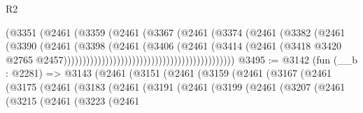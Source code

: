 \begin{lexlean}{R2}
\begin{coremodule}
                                                        (@3351
                                                          (@2461
                                                            (@3359
                                                              (@2461
                                                                (@3367
                                                                  (@2461
                                                                    (@3374
                                                                      (@2461
                                                                        (@3382
                                                                          (@2461
                                                                            (@3390
                                                                              (@2461
                                                                                (@3398
                                                                                  (@2461
                                                                                    (@3406
                                                                                      (@2461
                                                                                        (@3414
                                                                                          (@2461
                                                                                            (@3418
                                                                                              @3420
                                                                                              @2765
                                                                                              @2457)))))))))))))))))))))))))))))))))))))))))))))
@3495 := @3142
    (fun (__b : @2281) =>
    @3143
      (@2461
        (@3151
          (@2461
            (@3159
              (@2461
                (@3167
                  (@2461
                    (@3175
                      (@2461
                        (@3183
                          (@2461
                            (@3191
                              (@2461
                                (@3199
                                  (@2461
                                    (@3207
                                      (@2461
                                        (@3215
                                          (@2461
                                            (@3223
                                              (@2461

\end{coremodule}
\end{lexlean}
